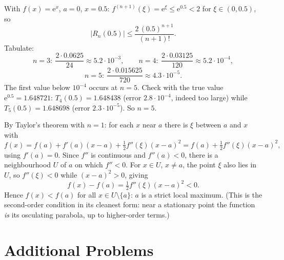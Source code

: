 \begin{solutions}
  \item With $f(x)=\mathrm{e}^{x}$, $a=0$, $x=0.5$:
        $f^{(n+1)}(\xi)=\mathrm{e}^{\xi}\leq\mathrm{e}^{0.5}<2$ for
        $\xi\in(0,0.5)$, so
        \[
          |R_{n}(0.5)|\leq\frac{2\,(0.5)^{n+1}}{(n+1)!} .
        \]
        Tabulate:
        \[
          n=3:\ \frac{2\cdot 0.0625}{24}\approx 5.2\cdot 10^{-3},
          \qquad
          n=4:\ \frac{2\cdot 0.03125}{120}\approx 5.2\cdot 10^{-4},
        \]
        \[
          n=5:\ \frac{2\cdot 0.015625}{720}\approx 4.3\cdot 10^{-5} .
        \]
        The first value below $10^{-4}$ occurs at $n=5$. Check with the
        true value $\mathrm{e}^{0.5}=1.648721$: $T_{4}(0.5)=1.648438$
        (error $2.8\cdot 10^{-4}$, indeed too large) while
        $T_{5}(0.5)=1.648698$ (error $2.3\cdot 10^{-5}$). So $n=5$.

  \item By Taylor's theorem with $n=1$: for each $x$ near $a$ there is
        $\xi$ between $a$ and $x$ with
        \[
          f(x)=f(a)+f'(a)(x-a)+\tfrac12 f''(\xi)(x-a)^{2}
              =f(a)+\tfrac12 f''(\xi)(x-a)^{2},
        \]
        using $f'(a)=0$. Since $f''$ is continuous and $f''(a)<0$,
        there is a neighbourhood $U$ of $a$ on which $f''<0$. For
        $x\in U$, $x\neq a$, the point $\xi$ also lies in $U$, so
        $f''(\xi)<0$ while $(x-a)^{2}>0$, giving
        \[
          f(x)-f(a)=\tfrac12 f''(\xi)(x-a)^{2}<0 .
        \]
        Hence $f(x)<f(a)$ for all $x\in U\setminus\{a\}$: $a$ is a
        strict local maximum. (This is the second-order condition in
        its cleanest form: near a stationary point the function
        \emph{is} its osculating parabola, up to higher-order terms.)
\end{solutions}

\section{Additional Problems}

